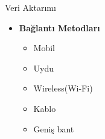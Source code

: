 \documentclass[
  12pt,
  ignorenonframetext,
]{beamer}
\providecommand{\tightlist}{%
  \setlength{\itemsep}{0pt}\setlength{\parskip}{0pt}}
\begin{document}
\begin{frame}{Veri Aktarımı}
\protect\hypertarget{veri-aktarux131mux131-1}{}

\begin{itemize}
\tightlist
\item
  \textbf{Bağlantı Metodları}

  \begin{itemize}
  \tightlist
  \item
    Mobil
  \item
    Uydu
  \item
    Wireless(Wi-Fi)
  \item
    Kablo
  \item
    Geniş bant
  \end{itemize}
\end{itemize}

\end{frame}
\end{document}
